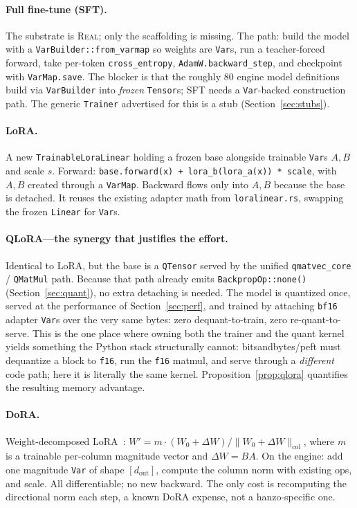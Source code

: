 \documentclass[11pt]{article}
\begin{document}
\paragraph{Full fine-tune (SFT).} The substrate is \textsc{Real}; only the scaffolding is missing. The path: build the model with a \texttt{VarBuilder::from\_varmap} so weights are \texttt{Var}s, run a teacher-forced forward, take per-token \texttt{cross\_entropy}, \texttt{AdamW.backward\_step}, and checkpoint with \texttt{VarMap.save}. The blocker is that the roughly $80$ engine model definitions build via \texttt{VarBuilder} into \emph{frozen} \texttt{Tensor}s; SFT needs a \texttt{Var}-backed construction path. The generic \texttt{Trainer} advertised for this is a stub (Section~\ref{sec:stubs}).

\paragraph{LoRA.} A new \texttt{TrainableLoraLinear} holding a frozen base alongside trainable \texttt{Var}s $A,B$ and scale $s$. Forward: \texttt{base.forward(x) + lora\_b(lora\_a(x)) * scale}, with $A,B$ created through a \texttt{VarMap}. Backward flows only into $A,B$ because the base is detached. It reuses the existing adapter math from \texttt{loralinear.rs}, swapping the frozen \texttt{Linear} for \texttt{Var}s.

\paragraph{QLoRA---the synergy that justifies the effort.} Identical to LoRA, but the base is a \texttt{QTensor} served by the unified \texttt{qmatvec\_core} / \texttt{QMatMul} path. Because that path already emits \texttt{BackpropOp::none()} (Section~\ref{sec:quant}), no extra detaching is needed. The model is quantized once, served at the performance of Section~\ref{sec:perf}, and trained by attaching \texttt{bf16} adapter \texttt{Var}s over the very same bytes: zero dequant-to-train, zero re-quant-to-serve. This is the one place where owning both the trainer and the quant kernel yields something the Python stack structurally cannot: bitsandbytes/peft must dequantize a block to \texttt{f16}, run the \texttt{f16} matmul, and serve through a \emph{different} code path; here it is literally the same kernel. Proposition~\ref{prop:qlora} quantifies the resulting memory advantage.

\paragraph{DoRA.} Weight-decomposed LoRA~\cite{liu2024dora}: $W' = m \cdot (W_0 + \Delta W)/\lVert W_0 + \Delta W \rVert_{\text{col}}$, where $m$ is a trainable per-column magnitude vector and $\Delta W = BA$. On the engine: add one magnitude \texttt{Var} of shape $[d_{\text{out}}]$, compute the column norm with existing ops, and scale. All differentiable; no new backward. The only cost is recomputing the directional norm each step, a known DoRA expense, not a hanzo-specific one.
\end{document}
